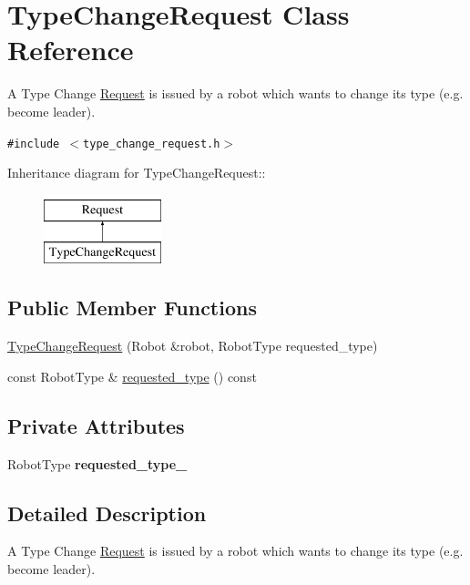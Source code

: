 \hypertarget{class_type_change_request}{
\section{TypeChangeRequest Class Reference}
\label{class_type_change_request}
}
A Type Change \hyperlink{class_request}{Request} is issued by a robot which wants to change its type (e.g. become leader).  


{\tt \#include $<$type\_\-change\_\-request.h$>$}

Inheritance diagram for TypeChangeRequest::\begin{figure}[H]
\begin{center}
\leavevmode
\includegraphics[height=2cm]{class_type_change_request}
\end{center}
\end{figure}
\subsection*{Public Member Functions}
\begin{CompactItemize}
\item 
\hyperlink{class_type_change_request_2722d08bb752b22163f2cb0fd82e1d6d}{TypeChangeRequest} (Robot \&robot, RobotType requested\_\-type)
\item 
const RobotType \& \hyperlink{class_type_change_request_bba308af9b35aa89b2feb9665249ea9a}{requested\_\-type} () const 
\end{CompactItemize}
\subsection*{Private Attributes}
\begin{CompactItemize}
\item 
\hypertarget{class_type_change_request_612c0385a16030c01d4324080408c52f}{
RobotType \textbf{requested\_\-type\_\-}}
\label{class_type_change_request_612c0385a16030c01d4324080408c52f}

\end{CompactItemize}


\subsection{Detailed Description}
A Type Change \hyperlink{class_request}{Request} is issued by a robot which wants to change its type (e.g. become leader). 

